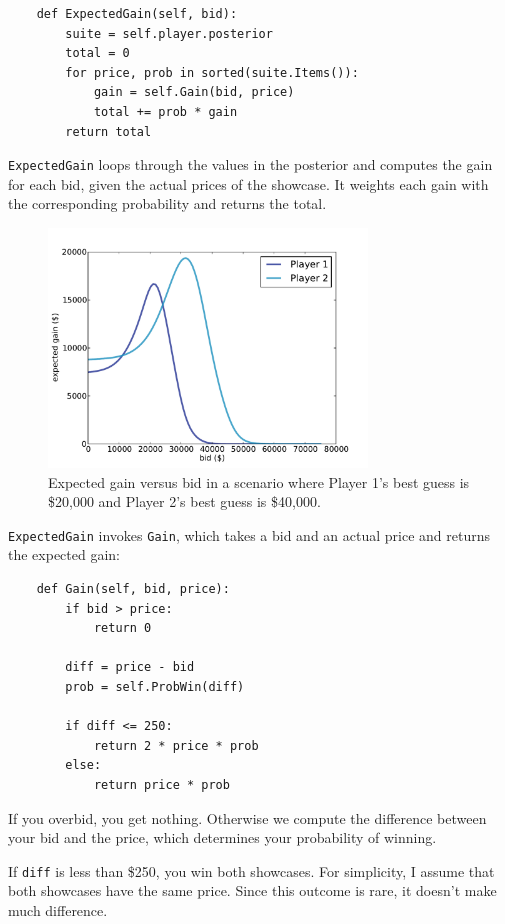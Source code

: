 \documentclass[12pt]{book}
\begin{document}
\begin{verbatim}
    def ExpectedGain(self, bid):
        suite = self.player.posterior
        total = 0
        for price, prob in sorted(suite.Items()):
            gain = self.Gain(bid, price)
            total += prob * gain
        return total
\end{verbatim}

{\tt ExpectedGain} loops through the values in the posterior
and computes the gain for each bid, given the actual prices of
the showcase.  It weights each gain with the corresponding
probability and returns the total.

\begin{figure}
\centerline{\includegraphics[height=2.5in]{figs/price5.pdf}}
\caption{Expected gain versus bid in a scenario where Player 1's best 
guess is \$20,000 and Player 2's best guess is \$40,000.}
\label{fig.price5}
\end{figure}

{\tt ExpectedGain} invokes {\tt Gain}, which takes a bid and an actual
price and returns the expected gain:

\begin{verbatim}
    def Gain(self, bid, price):
        if bid > price:
            return 0

        diff = price - bid
        prob = self.ProbWin(diff)

        if diff <= 250:
            return 2 * price * prob
        else:
            return price * prob
\end{verbatim}

If you overbid, you get nothing.  Otherwise we compute 
the difference between your bid and the price, which determines
your probability of winning.

If {\tt diff} is less than \$250, you win both showcases.  For
simplicity, I assume that both showcases have the same price.  Since
this outcome is rare, it doesn't make much difference.
\end{document}

